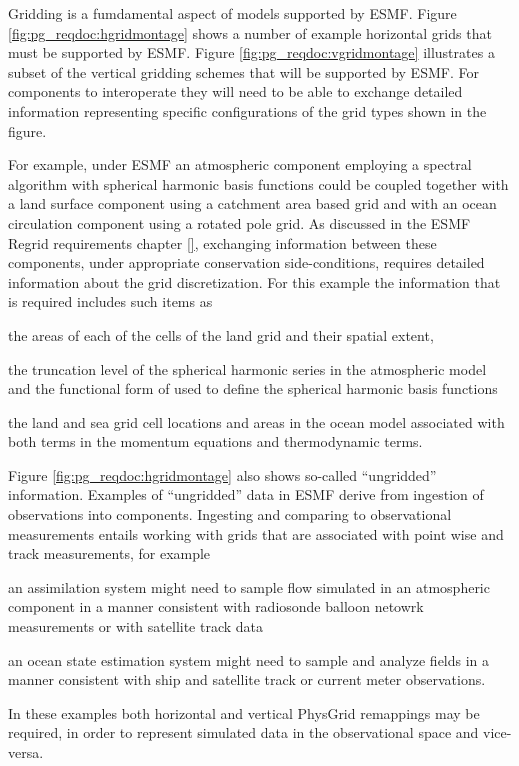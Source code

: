 Gridding is a fumdamental aspect of models supported by ESMF.
Figure \ref{fig:pg_reqdoc:hgridmontage} shows a number of example 
horizontal grids that must be supported by ESMF. 
Figure \ref{fig:pg_reqdoc:vgridmontage} illustrates a subset of the 
vertical gridding schemes that will be supported by ESMF.
For components to interoperate they will need to be able to exchange detailed 
information representing specific configurations of the grid types
shown in the figure.
 
 For example, under ESMF an atmospheric component employing a spectral
algorithm with spherical harmonic basis functions could be coupled
together with a land surface component using a catchment area based grid
and with an ocean circulation component using a rotated pole grid.
As discussed in the ESMF Regrid requirements chapter \ref{}, exchanging information 
between these components, under appropriate conservation side-conditions, requires 
detailed information about the grid discretization. For this example the
information that is required includes such items as
\begin{description}
\item the areas of each of the cells of the land grid and
their spatial extent, 

\item the truncation level of the spherical harmonic
series in the atmospheric model and the functional form of
used to define the spherical harmonic basis functions

\item the land and sea grid cell locations and areas in the ocean model
associated with both terms in the momentum equations and
thermodynamic terms.
\end{description}

Figure \ref{fig:pg_reqdoc:hgridmontage} also shows so-called ``ungridded''
information. Examples of ``ungridded'' data in ESMF derive from
ingestion of observations into components.
Ingesting and comparing to observational measurements entails
working with grids that are associated with point wise 
and track measurements, for example
\begin{description}
\item an assimilation system might need to
sample flow simulated in an atmospheric component in 
a manner consistent with radiosonde balloon netowrk measurements
or with satellite track data
\item an ocean state estimation system might need to sample and analyze
fields in a manner consistent with ship and satellite
track or current meter observations.
\end{description}
In these examples both horizontal and vertical PhysGrid remappings
may be required, in order to represent simulated data in the observational
space and vice-versa.

